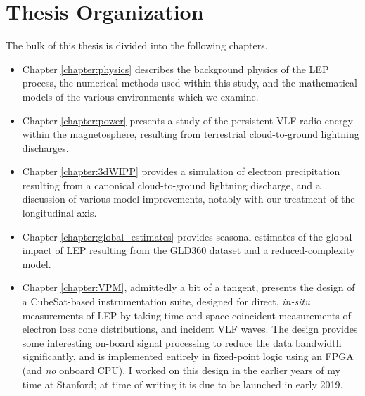 \section{Thesis Organization}
The bulk of this thesis is divided into the following chapters.
\begin{itemize}
\item Chapter \ref{chapter:physics} describes the background physics of the LEP process, the numerical methods used within this study, and the mathematical models of the various environments which we examine. 
\item Chapter \ref{chapter:power} presents a study of the persistent VLF radio energy within the magnetosphere, resulting from terrestrial cloud-to-ground lightning discharges. 
\item Chapter \ref{chapter:3dWIPP} provides a simulation of electron precipitation resulting from a canonical cloud-to-ground lightning discharge, and a discussion of various model improvements, notably with our treatment of the longitudinal axis. 
\item Chapter \ref{chapter:global_estimates} provides seasonal estimates of the global impact of LEP resulting from the GLD360 dataset and a reduced-complexity model. \item Chapter \ref{chapter:VPM}, admittedly a bit of a tangent, presents the design of a CubeSat-based instrumentation suite, designed for direct, \emph{in-situ} measurements of LEP by taking time-and-space-coincident measurements of electron loss cone distributions, and incident VLF waves. The design provides some interesting on-board signal processing to reduce the data bandwidth significantly, and is implemented entirely in fixed-point logic using an FPGA (and \emph{no} onboard CPU). I worked on this design in the earlier years of my time at Stanford; at time of writing it is due to be launched in early 2019.
\end{itemize}